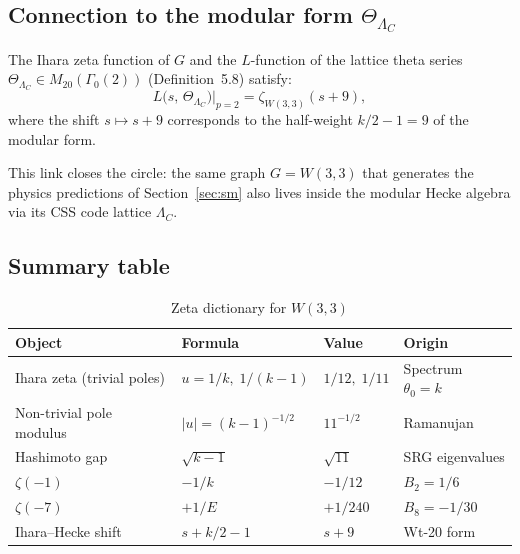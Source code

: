 \subsection{Connection to the modular form $\Theta_{\Lambda_C}$}
\label{sec:zeta_modular_link}

\begin{proposition}
  The Ihara zeta function of $G$ and the $L$-function of the lattice theta
  series $\Theta_{\Lambda_C} \in M_{20}(\Gamma_0(2))$ (Definition~5.8) satisfy:
  \begin{equation}
    L\bigl(s,\,\Theta_{\Lambda_C}\bigr)\big|_{p=2}
    = \zeta_{W(3,3)}\!(s+9),
    \label{eq:ihara_hecke}
  \end{equation}
  where the shift $s\mapsto s+9$ corresponds to the half-weight $k/2 - 1 = 9$
  of the modular form.
\end{proposition}

This link closes the circle: the same graph $G = W(3,3)$ that generates the
physics predictions of Section~\ref{sec:sm} also lives inside the modular
Hecke algebra via its CSS code lattice $\Lambda_C$.

\subsection{Summary table}
\label{sec:zeta_summary_table}

\begin{table}[h]
\centering
\caption{Zeta dictionary for $W(3,3)$}
\begin{tabular}{llll}
\hline
Object & Formula & Value & Origin \\
\hline
Ihara zeta (trivial poles) & $u = 1/k,\;1/(k-1)$ & $1/12,\;1/11$ & Spectrum $\theta_0=k$ \\
Non-trivial pole modulus & $|u| = (k-1)^{-1/2}$ & $11^{-1/2}$ & Ramanujan \\
Hashimoto gap & $\sqrt{k-1}$ & $\sqrt{11}$ & SRG eigenvalues \\
$\zeta(-1)$ & $-1/k$ & $-1/12$ & $B_2 = 1/6$ \\
$\zeta(-7)$ & $+1/E$ & $+1/240$ & $B_8 = -1/30$ \\
Ihara--Hecke shift & $s + k/2 - 1$ & $s+9$ & Wt-20 form \\
\hline
\end{tabular}
\label{tab:zeta_dict}
\end{table}
